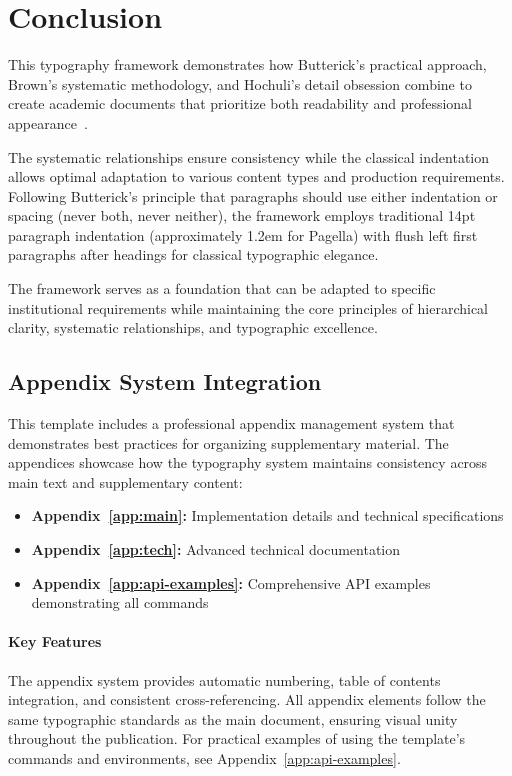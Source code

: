 \documentclass[11pt]{article}
\begin{document}
\section{Conclusion}

This typography framework demonstrates how Butterick's practical approach, Brown's systematic methodology, and Hochuli's detail obsession combine to create academic documents that prioritize both readability and professional appearance~\parencite{butterick2019practical, brown2018flexible, hochuli1987detail}. 

The systematic relationships ensure consistency while the classical indentation allows optimal adaptation to various content types and production requirements. Following Butterick's principle that paragraphs should use either indentation or spacing (never both, never neither), the framework employs traditional 14pt paragraph indentation (approximately 1.2em for Pagella) with flush left first paragraphs after headings for classical typographic elegance.

The framework serves as a foundation that can be adapted to specific institutional requirements while maintaining the core principles of hierarchical clarity, systematic relationships, and typographic excellence.

\subsection{Appendix System Integration}

This template includes a professional appendix management system that demonstrates best practices for organizing supplementary material.
The appendices showcase how the typography system maintains consistency across main text and supplementary content:

\begin{itemize}
  \item \textbf{Appendix~\ref{app:main}:} Implementation details and technical specifications
  \item \textbf{Appendix~\ref{app:tech}:} Advanced technical documentation
  \item \textbf{Appendix~\ref{app:api-examples}:} Comprehensive API examples demonstrating all commands
\end{itemize}

\paragraph{Key Features} The appendix system provides automatic numbering, table of contents integration, and consistent cross-referencing.
All appendix elements follow the same typographic standards as the main document, ensuring visual unity throughout the publication.
For practical examples of using the template's commands and environments, see Appendix~\ref{app:api-examples}.
\startappendices
  
  
  
\finishappendices

\printbibliography
\end{document}
